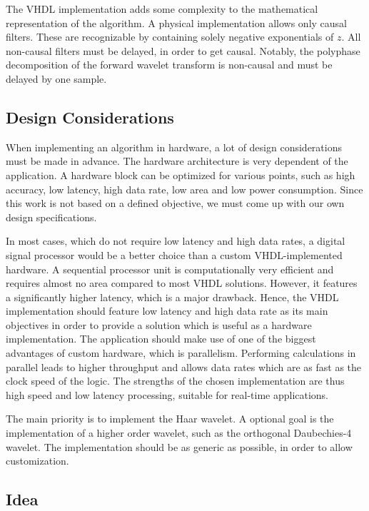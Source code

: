 \begin{refsection}
The VHDL implementation adds some complexity to the mathematical representation of the algorithm.
A physical implementation allows only causal filters.
These are recognizable by containing solely negative exponentials of $z$.
All non-causal filters must be delayed, in order to get causal.
Notably, the polyphase decomposition of the forward wavelet transform is non-causal and must be delayed by one sample.

\subsection{Design Considerations}

When implementing an algorithm in hardware, a lot of design considerations must be made in advance.
The hardware architecture is very dependent of the application.
A hardware block can be optimized for various points, such as high accuracy, low latency, high data rate, low area and low power consumption.
Since this work is not based on a defined objective, we must come up with our own design specifications.

In most cases, which do not require low latency and high data rates, a digital signal processor would be a better choice than a custom VHDL-implemented hardware.
A sequential processor unit is computationally very efficient and requires almost no area compared to most VHDL solutions.
However, it features a significantly higher latency, which is a major drawback.
Hence, the VHDL implementation should feature low latency and high data rate as its main objectives in order to provide a solution which is useful as a hardware implementation.
The application should make use of one of the biggest advantages of custom hardware, which is parallelism.
Performing calculations in parallel leads to higher throughput and allows data rates which are as fast as the clock speed of the logic.
The strengths of the chosen implementation are thus high speed and low latency processing, suitable for real-time applications.

The main priority is to implement the Haar wavelet.
A optional goal is the implementation of a higher order wavelet, such as the orthogonal Daubechies-4 wavelet.
The implementation should be as generic as possible, in order to allow customization.

\subsection{Idea}


\end{refsection}
